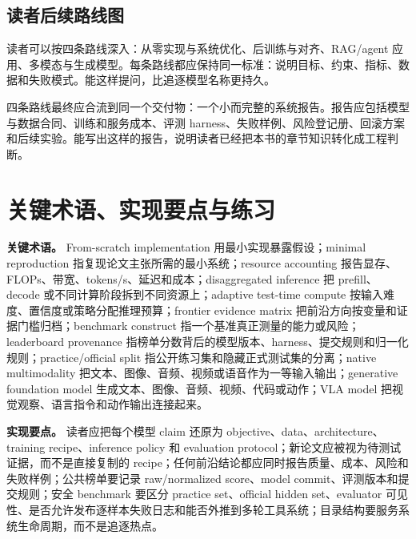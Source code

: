 \documentclass[UTF8,zihao=-4,openany]{ctexbook}
\begin{document}
\subsection{读者后续路线图}
读者可以按四条路线深入：从零实现与系统优化、后训练与对齐、RAG/agent 应用、多模态与生成模型。每条路线都应保持同一标准：说明目标、约束、指标、数据和失败模式。能这样提问，比追逐模型名称更持久。

四条路线最终应合流到同一个交付物：一个小而完整的系统报告。报告应包括模型与数据合同、训练和服务成本、评测 harness、失败样例、风险登记册、回滚方案和后续实验。能写出这样的报告，说明读者已经把本书的章节知识转化成工程判断。

\section{关键术语、实现要点与练习}
\textbf{关键术语。} From-scratch implementation 用最小实现暴露假设；minimal reproduction 指复现论文主张所需的最小系统；resource accounting 报告显存、FLOPs、带宽、tokens/s、延迟和成本；disaggregated inference 把 prefill、decode 或不同计算阶段拆到不同资源上；adaptive test-time compute 按输入难度、置信度或策略分配推理预算；frontier evidence matrix 把前沿方向按变量和证据门槛归档；benchmark construct 指一个基准真正测量的能力或风险；leaderboard provenance 指榜单分数背后的模型版本、harness、提交规则和归一化规则；practice/official split 指公开练习集和隐藏正式测试集的分离；native multimodality 把文本、图像、音频、视频或语音作为一等输入输出；generative foundation model 生成文本、图像、音频、视频、代码或动作；VLA model 把视觉观察、语言指令和动作输出连接起来。

\textbf{实现要点。} 读者应把每个模型 claim 还原为 objective、data、architecture、training recipe、inference policy 和 evaluation protocol；新论文应被视为待测试证据，而不是直接复制的 recipe；任何前沿结论都应同时报告质量、成本、风险和失败样例；公共榜单要记录 raw/normalized score、model commit、评测版本和提交规则；安全 benchmark 要区分 practice set、official hidden set、evaluator 可见性、是否允许发布逐样本失败日志和能否外推到多轮工具系统；目录结构要服务系统生命周期，而不是追逐热点。
\end{document}
